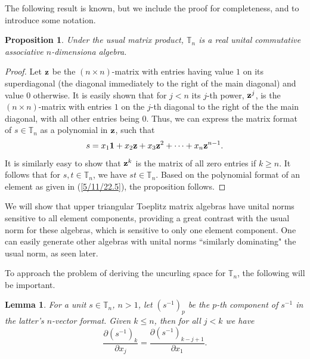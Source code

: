 \documentclass{amsart}
\numberwithin{equation}{section}
\newtheorem{lemma}[theorem]{Lemma}
\newtheorem{proposition}[theorem]{Proposition}
\theoremstyle{definition}
\numberwithin{theorem}{section}
\begin{document}
The following result is known, but we include the proof for completeness, and to introduce some notation.  



 \begin{proposition}\label{5/10/22.1} Under the usual matrix product, $\mathbb{T}_n$ is a real unital commutative associative $n$-dimensiona algebra.\end{proposition} 
 
 \begin{proof}
Let ${\bf z}$ be the $(n \times n)$-matrix with entries having value $1$ on its superdiagonal  (the diagonal immediately to the right of the main diagonal) and value $0$ otherwise.  It is easily shown that for $j<n$ its $j$-th power, ${\bf z}^j$, is the $(n\times n)$-matrix with entries $1$ on the $j$-th diagonal to the right of the the main diagonal, with all other entries being $0$.   Thus, we can express the matrix format of $s\in\mathbb{T}_n$ as a polynomial in ${\bf z}$, such that
\begin{equation}\label{5/11/22.5} s = x_1 {\bf 1} + x_2 {\bf z} + x_3 {\bf z}^2 + \cdots + x_n {\bf z}^{n-1}.\end{equation}  It is similarly easy to show that ${\bf z}^k$ is the matrix of all zero entries if $k\ge n$.  It follows that for $s,t\in \mathbb{T}_n$, we have $st\in \mathbb{T}_n$.   Based on the polynomial format of an element as given in (\ref{5/11/22.5}), the proposition follows.
 \end{proof}
 

We will show that upper triangular Toeplitz matrix algebras have unital norms sensitive to all element components, providing a great contrast with the usual norm for these algebras, which is sensitive to only one element component.  One can easily generate other algebras with unital norms ``similarly dominating" the usual norm, as seen later.

To approach the problem of deriving the uncurling space for $\mathbb{T}_n$, the following will be important.

\begin{lemma} \label{5/7/22.15} For a unit $s\in \mathbb{T}_n$,  $n>1$, let $\left( s^{-1} \right)_p$ be the $p$-th component of $s^{-1}$ in the latter's $n$-vector format.  Given $k\le n$, then for all $j<k$ we have \begin{equation}\label{5/6/22.10} \frac{\partial \left( s^{-1} \right)_k}{\partial x_j} = \frac{\partial \left( s^{-1} \right)_{k-j+1}}{\partial x_1}.\end{equation}
\end{lemma}
\end{document}
